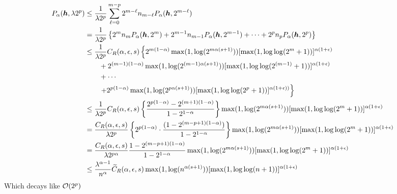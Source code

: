 \documentclass{amsart}
\begin{document}
\begin{align*}
    P_\alpha(\vh,\lambda 2^p)
    & \le \frac {1}{\lambda 2^p} \sum_{\ell = 0}^{m-p} 2^{m-\ell} n_{m -\ell} P_\alpha(\vh,2^{m-\ell}) \\
    &= \frac {1}{\lambda 2^p} \left\{2^m n_m P_\alpha(\vh,2^m) + 2^{m-1} n_{m-1} P_\alpha(\vh,2^{m-1}) + \cdots + 2^p n_p P_\alpha(\vh,2^p) %
    \right\} \\ %
    & \le \frac {1}{\lambda 2^p} C_{R}(\alpha,\epsilon,s) \left\{ 2^{m(1-\alpha)}\max(1, \log(2^{m\alpha(s+1)})) [\max(1,\log \log (
    2^m+1))]^{\alpha(1+\epsilon)}\right .\\ 
    & \qquad  + 2^{(m-1)(1-\alpha)}\max(1, \log(2^{(m-1)\alpha(s+1)})) [\max(1,\log \log (
    2^{(m-1)}+1))]^{\alpha(1+\epsilon)}\\
      &  \qquad + \cdots \\
      & \qquad  \left . +   2^{p(1-\alpha)}\max(1,\log(2^{p\alpha(s+1)})) [\max(1,\log \log (2^p+1))]^{\alpha(1+\epsilon))}  \right\}\\
    & \le \frac {1}{\lambda 2^p} C_{R}(\alpha,\epsilon,s) 
    \left\{\frac{2^{p(1-\alpha)} - 2^{(m+1)(1- \alpha )}}{1 - 2^{1 -\alpha}}\right\} \max(1, \log(2^{m\alpha(s+1)})) [\max(1,\log \log (
    2^m+1))]^{\alpha(1+\epsilon)} \\
    & = \frac { C_{R}(\alpha,\epsilon,s)}{\lambda 2^p} \left\{ 2^{p(1-\alpha)} \cdot \frac{(1 - 2^{(m-p+1)(1- \alpha )})}{1 - 2^{1- \alpha}}\right\} 
     \max(1, \log(2^{m\alpha(s+1)})) [\max(1,\log \log (
    2^m+1))]^{\alpha(1+\epsilon)} \\
    &=  \frac {C_{R}(\alpha,\epsilon,s)}{\lambda 2^{p\alpha}}  \frac{1 - 2^{(m-p+1)(1- \alpha )}}{1 - 2^{1- \alpha}} \max(1, \log(2^{m\alpha(s+1)})) [\max(1,\log \log (
    2^m+1))]^{\alpha(1+\epsilon)} \\
    &\le \frac{\lambda^{\alpha -1}}{n^{\alpha}} \widetilde{C}_{R}(\alpha,\epsilon,s)  \max(1, \log(n^{\alpha(s+1)})) [\max(1,\log \log (
    n+1))]^{\alpha(1+\epsilon)} \\ 
\end{align*}
Which decays like $\operatorname{{\mathcal O}}(2^p)$ \\
\end{document}
